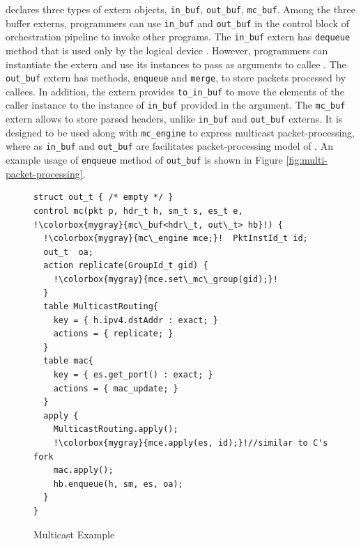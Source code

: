 \documentclass[letterpaper,twocolumn,10pt]{article}
\begin{document}
\uarch declares three types of extern objects, \texttt{in\_buf}, \texttt{out\_buf}, \texttt{mc\_buf}.
Among the three buffer externs, programmers can use \texttt{in\_buf} and \texttt{out\_buf} in the control block of orchestration pipeline to invoke other programs.
The \texttt{in\_buf} extern has \texttt{dequeue} method that is used only by the logical device \uswitch. 
However, programmers can instantiate the extern and use its instances to pass as arguments to callee \uprograms.
The \texttt{out\_buf} extern has methods, \texttt{enqueue} and \texttt{merge}, to store packets processed by callees.
In addition, the extern provides \texttt{to\_in\_buf} to move the elements of the caller instance to the instance of \texttt{in\_buf} provided in the argument.
The \texttt{mc\_buf} extern allows to store parsed headers, unlike \texttt{in\_buf} and \texttt{out\_buf} externs.
It is designed to  be used along with \texttt{mc\_engine} to express multicast packet-processing, where as \texttt{in\_buf} and \texttt{out\_buf} are facilitates packet-processing model of \uswitch.
An example usage of \texttt{enqueue} method of \texttt{out\_buf} is shown in Figure \ref{fig:multi-packet-processing}.

\begin{figure}[h]
\begin{lstlisting}[frame=none, escapechar=!]
struct out_t { /* empty */ }
control mc(pkt p, hdr_t h, sm_t s, es_t e, !\colorbox{mygray}{mc\_buf<hdr\_t, out\_t> hb}!) {
  !\colorbox{mygray}{mc\_engine mce;}!  PktInstId_t id; 
  out_t  oa;
  action replicate(GroupId_t gid) {
    !\colorbox{mygray}{mce.set\_mc\_group(gid);}!
  }
  table MulticastRouting{
    key = { h.ipv4.dstAddr : exact; } 
    actions = { replicate; }
  }
  table mac{
    key = { es.get_port() : exact; } 
    actions = { mac_update; }
  }
  apply {
    MulticastRouting.apply();
    !\colorbox{mygray}{mce.apply(es, id);}!//similar to C's fork
    mac.apply();
    hb.enqueue(h, sm, es, oa);
  }
}
\end{lstlisting}
\caption{Multicast Example}
\label{fig:multicast-example}
\end{figure}
\end{document}
